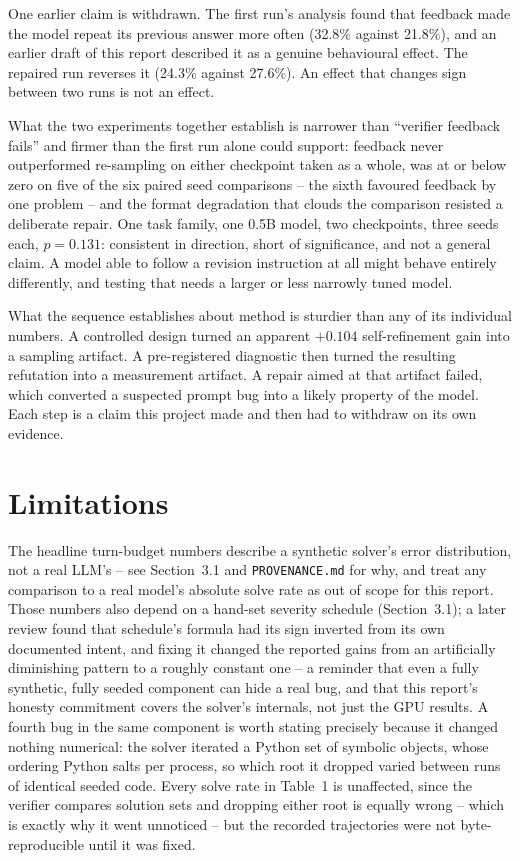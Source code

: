 \documentclass[11pt]{article}
\begin{document}
One earlier claim is withdrawn. The first run's analysis found that feedback
made the model repeat its previous answer more often (32.8\% against
21.8\%), and an earlier draft of this report described it as a genuine
behavioural effect. The repaired run reverses it (24.3\% against 27.6\%). An
effect that changes sign between two runs is not an effect.

What the two experiments together establish is narrower than ``verifier
feedback fails'' and firmer than the first run alone could support:
feedback never outperformed re-sampling on either checkpoint taken as a
whole, was at or below zero on five of the six paired seed comparisons --
the sixth favoured feedback by one problem -- and the format degradation that clouds the
comparison resisted a deliberate repair. One task family, one 0.5B model,
two checkpoints, three seeds each, $p=0.131$: consistent in direction,
short of significance, and not a general claim. A model able to follow a
revision instruction at all might behave entirely differently, and testing
that needs a larger or less narrowly tuned model.

What the sequence establishes about method is sturdier than any of its
individual numbers. A controlled design turned an apparent $+0.104$
self-refinement gain into a sampling artifact. A pre-registered diagnostic
then turned the resulting refutation into a measurement artifact. A repair
aimed at that artifact failed, which converted a suspected prompt bug into
a likely property of the model. Each step is a claim this project made and
then had to withdraw on its own evidence.

\section{Limitations}
The headline turn-budget numbers describe a synthetic solver's error
distribution, not a real LLM's -- see Section~3.1 and
\texttt{PROVENANCE.md} for why, and treat any comparison to a real model's
absolute solve rate as out of scope for this report. Those numbers also
depend on a hand-set severity schedule (Section~3.1); a later review found
that schedule's formula had its sign inverted from its own documented
intent, and fixing it changed the reported gains from an artificially
diminishing pattern to a roughly constant one -- a reminder that even a
fully synthetic, fully seeded component can hide a real bug, and that this
report's honesty commitment covers the solver's internals, not just the
GPU results. A fourth bug in the same component is worth stating precisely
because it changed nothing numerical: the solver iterated a Python set of
symbolic objects, whose ordering Python salts per process, so which root
it dropped varied between runs of identical seeded code. Every solve rate
in Table~1 is unaffected, since the verifier compares solution sets and
dropping either root is equally wrong -- which is exactly why it went
unnoticed -- but the recorded trajectories were not byte-reproducible
until it was fixed.
\end{document}
